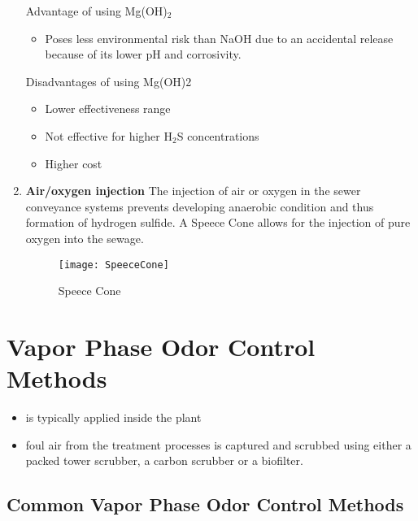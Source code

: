 \begin{enumerate}
Advantage of using Mg(OH)$_2$
\begin{itemize}
\item Poses less environmental risk than NaOH due to an accidental release because of its lower pH and corrosivity.
\end{itemize}
\clearpage
Disadvantages of using Mg(OH)2
\begin{itemize}
\item Lower effectiveness range
\item Not effective for higher H$_2$S concentrations
\item Higher cost
\end{itemize}


\item \textbf{Air/oxygen injection}
The injection of air or oxygen in the sewer conveyance systems prevents developing anaerobic condition and thus  formation of hydrogen sulfide.  A Speece Cone allows for the injection of pure oxygen into the sewage.

\begin{figure}
	\begin{center}
		\texttt{[image: SpeeceCone]}
			\caption{Speece Cone}
	\end{center}
	
	\end{figure}
\end{enumerate}
\section{Vapor Phase Odor Control Methods}
\begin{itemize}
	\item is typically applied inside the plant
	\item foul air from the treatment processes is captured and scrubbed using either a packed tower scrubber, a carbon scrubber or a biofilter.
	\end{itemize}
\subsection{Common Vapor Phase Odor Control Methods}

